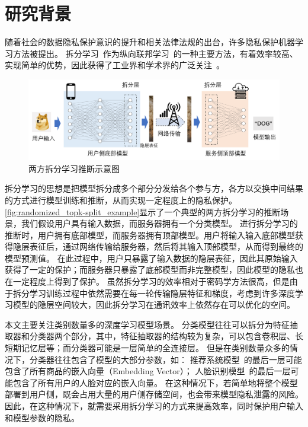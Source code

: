 \section{研究背景}
随着社会的数据隐私保护意识的提升和相关法律法规的出台，许多隐私保护机器学习方法被提出。
%
拆分学习~\cite{vepakomma2018split,poirot2019split}作为纵向联邦学习~\cite{liu2024vertical}的一种主要方法，有着效率较高、实现简单的优势，因此获得了工业界和学术界的广泛关注~\cite{palanisamy2021spliteasy,koda2020split_mmwave,fagbohungbe2022split_edge_image,roth2022split_unet}。
%


\begin{figure}[htbp]
    \centering
    \includegraphics[width=\linewidth]{Z_Resources/随机topk_两方拆分学习示意图.png}
    \caption{两方拆分学习推断示意图}
    \label{fig:randomized_topk-split_example}
\end{figure}

拆分学习的思想是把模型拆分成多个部分分发给各个参与方，各方以交换中间结果的方式进行模型训练和推断，从而实现一定程度上的隐私保护。
%
\autoref{fig:randomized_topk-split_example}显示了一个典型的两方拆分学习的推断场景，我们假设用户具有输入数据，而服务器拥有一个分类模型。
%
进行拆分学习的推断时，用户拥有底部模型，而服务器拥有顶部模型。用户将输入输入底部模型获得隐层表征后，通过网络传输给服务器，然后将其输入顶部模型，从而得到最终的模型预测值。
%
在此过程中，用户只暴露了输入数据的隐层表征，因此其原始输入获得了一定的保护；而服务器只暴露了底部模型而非完整模型，因此模型的隐私也在一定程度上得到了保护。
%
虽然拆分学习的效率相对于密码学方法很高，但是由于拆分学习训练过程中依然需要在每一轮传输隐层特征和梯度，考虑到许多深度学习模型的隐层空间较大，因此拆分学习在通讯效率上依然存在可以优化的空间。
%



本文主要关注类别数量多的深度学习模型场景。
%
分类模型往往可以拆分为特征抽取器和分类器两个部分，其中，特征抽取器的结构较为复杂，可以包含卷积层、长短期记忆层等；而分类器可能是一层简单的全连接层。
%
但是在类别数量众多的情况下，分类器往往包含了模型的大部分参数，如：
%
推荐系统模型~\cite{jannach2017gru4rec,kang2018sasrec}的最后一层可能包含了所有商品的嵌入向量（Embedding Vector）；
%
人脸识别模型~\cite{parkhi2015deepface}的最后一层可能包含了所有用户的人脸对应的嵌入向量。
%
在这种情况下，若简单地将整个模型部署到用户侧，既会占用大量的用户侧存储空间，也会带来模型隐私泄露的风险。
%
因此，在这种情况下，就需要采用拆分学习的方式来提高效率，同时保护用户输入和模型参数的隐私。

